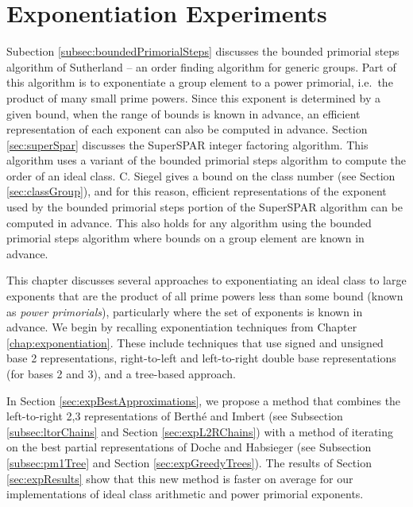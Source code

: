 \documentclass{ucalgthes1}
\theoremstyle{definition}
\begin{document}
\chapter{Exponentiation Experiments}
\label{chap:powExperiments}

Subection \ref{subsec:boundedPrimorialSteps} discusses the bounded primorial steps algorithm of Sutherland \cite[\S 4.1]{Sutherland2007} -- an order finding algorithm for generic groups.  Part of this algorithm is to exponentiate a group element to a power primorial, i.e.\ the product of many small prime powers.  Since this exponent is determined by a given bound, when the range of bounds is known in advance, an efficient representation of each exponent can also be computed in advance.  Section \ref{sec:superSpar} discusses the SuperSPAR integer factoring algorithm.  This algorithm uses a variant of the bounded primorial steps algorithm to compute the order of an ideal class.  C. Siegel \cite[p.247]{Crandall2001} gives a bound on the class number (see Section \ref{sec:classGroup}), and for this reason, efficient representations of the exponent used by the bounded primorial steps portion of the SuperSPAR algorithm can be computed in advance.  This also holds for any algorithm using the bounded primorial steps algorithm where bounds on a group element are known in advance.

This chapter discusses several approaches to exponentiating an ideal class to large exponents that are the product of all prime powers less than some bound (known as \emph{power primorials}), particularly where the set of exponents is known in advance.  We begin by recalling exponentiation techniques from Chapter \ref{chap:exponentiation}.  These include techniques that use signed and unsigned base 2 representations, right-to-left and left-to-right double base representations (for bases 2 and 3), and a tree-based approach.  

In Section \ref{sec:expBestApproximations}, we propose a method that combines the left-to-right 2,3 representations of Berth{\'e} and Imbert \cite{Berthe2009} (see Subsection \ref{subsec:ltorChains} and Section \ref{sec:expL2RChains}) with a method of iterating on the best partial representations of Doche and Habsieger \cite{Doche2008} (see Subsection \ref{subsec:pm1Tree} and Section \ref{sec:expGreedyTrees}).  The results of Section \ref{sec:expResults} show that this new method is faster on average for our implementations of ideal class arithmetic and power primorial exponents.
\end{document}
